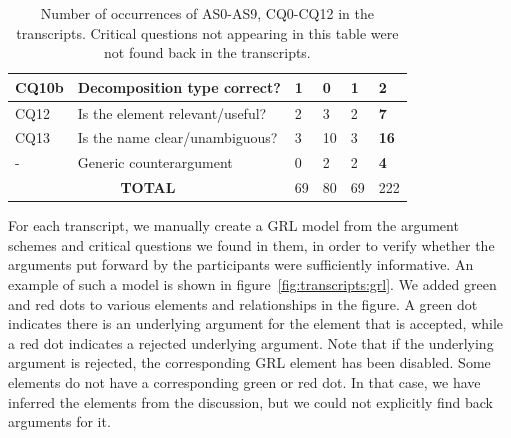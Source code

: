 \begin{table}[ht]
\begin{tabularx}{0.5\textwidth}{|l|X|l|l|l|>{\bfseries}l|}
\hline
CQ10b & Decomposition type correct? &1 &0& 1 &2\\
\hline
\hline
CQ12 & Is the element relevant/useful? & 2 & 3 & 2 &7\\
\hline
CQ13 & Is the name clear/unambiguous? &3 &10 & 3 & 16\\
\hline
\hline
- & Generic counterargument & 0& 2 & 2 & 4\\
\hline
\hline
\multicolumn{2}{|c|}{\textbf{TOTAL}}&69&80&69&222\\
\hline
\end{tabularx}
\caption{Number of occurrences of AS0-AS9, CQ0-CQ12 in the transcripts. Critical questions not appearing in this table were not found back in the transcripts.}
\label{table:transcripts:results:argumentschemes}
\end{table}

For each transcript, we manually create a GRL model from the argument schemes and critical questions we found in them, in order to verify whether the arguments put forward by the participants were sufficiently informative. An example of such a model is shown in figure~\ref{fig:transcripts:grl}. We added green and red dots to various elements and relationships in the figure. A green dot indicates there is an underlying argument for the element that is accepted, while a red dot indicates a rejected underlying argument. Note that if the underlying argument is rejected, the corresponding GRL element has been disabled. Some elements do not have a corresponding green or red dot. In that case, we have inferred the elements from the discussion, but we could not explicitly find back arguments for it.

